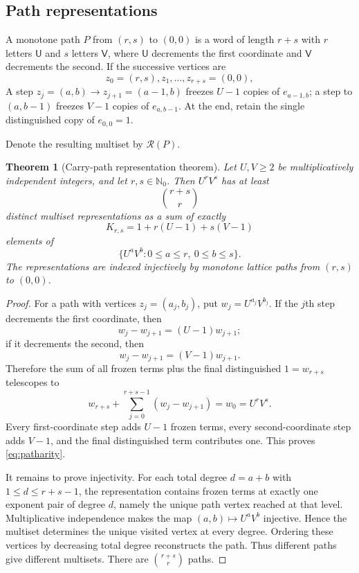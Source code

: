 \documentclass[11pt,oneside]{article}
\newtheorem{theorem}{Theorem}[section]
\theoremstyle{definition}
\newcommand{\N}{\mathbb{N}}
\begin{document}
\subsection{Path representations}

A monotone path $P$ from $(r,s)$ to $(0,0)$ is a word of length $r+s$ with $r$ letters $\mathsf{U}$ and $s$ letters $\mathsf{V}$, where $\mathsf{U}$ decrements the first coordinate and $\mathsf{V}$ decrements the second.  If the successive vertices are
\[
       z_0=(r,s),z_1,\ldots,z_{r+s}=(0,0),
\]
A step $z_j=(a,b)\to z_{j+1}=(a-1,b)$ freezes $U-1$ copies of $e_{a-1,b}$; a step to $(a,b-1)$ freezes $V-1$ copies of $e_{a,b-1}$.  At the end, retain the single distinguished copy of $e_{0,0}=1$.

Denote the resulting multiset by $\mathcal R(P)$.

\begin{theorem}[Carry-path representation theorem]\label{thm:carrypath}
Let $U,V\ge2$ be multiplicatively independent integers, and let $r,s\in\N_0$.  Then $U^rV^s$ has at least
\[
       \binom{r+s}{r}
\]
distinct multiset representations as a sum of exactly
\begin{equation}\label{eq:patharity}
       K_{r,s}=1+r(U-1)+s(V-1)
\end{equation}
elements of
\[
       \{U^aV^b:0\le a\le r,\ 0\le b\le s\}.
\]
The representations are indexed injectively by monotone lattice paths from $(r,s)$ to $(0,0)$.
\end{theorem}

\begin{proof}
For a path with vertices $z_j=(a_j,b_j)$, put
$w_j=U^{a_j}V^{b_j}$.  If the $j$th step decrements the first coordinate, then
\[
       w_j-w_{j+1}=(U-1)w_{j+1};
\]
if it decrements the second, then
\[
       w_j-w_{j+1}=(V-1)w_{j+1}.
\]
Therefore the sum of all frozen terms plus the final distinguished $1=w_{r+s}$ telescopes to
\[
    w_{r+s}+\sum_{j=0}^{r+s-1}(w_j-w_{j+1})=w_0=U^rV^s.
\]
Every first-coordinate step adds $U-1$ frozen terms, every second-coordinate step adds $V-1$, and the final distinguished term contributes one.  This proves \eqref{eq:patharity}.

It remains to prove injectivity.  For each total degree
$d=a+b$ with $1\le d\le r+s-1$, the representation contains frozen terms at exactly one exponent pair of degree $d$, namely the unique path vertex reached at that level.  Multiplicative independence makes the map $(a,b)\mapsto U^aV^b$ injective.  Hence the multiset determines the unique visited vertex at every degree.  Ordering these vertices by decreasing total degree reconstructs the path.  Thus different paths give different multisets.  There are $\binom{r+s}{r}$ paths.
\end{proof}
\end{document}
